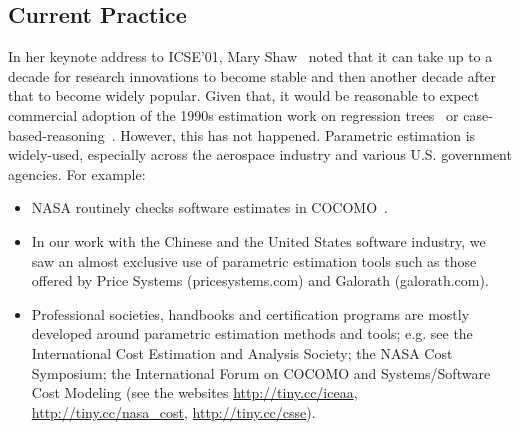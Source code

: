 \documentclass[smallcondesed]{svjour3}
\newcommand{\bi}{\begin{itemize}[leftmargin=0.4cm]}
\newcommand{\ei}{\end{itemize}}
\begin{document}

 
\subsection{Current Practice}
In her keynote address to ICSE'01, Mary Shaw~\cite{shaw01} noted that it can take up to a
decade  for  research innovations
to become stable and then another decade after that to become widely popular. Given that, it would be reasonable
to expect commercial adoption of  the 1990s estimation work
on  regression trees~\cite{shepperd97} or case-based-reasoning~\cite{shepperd97}. However, 
this has not happened.
Parametric estimation is
widely-used, especially across the aerospace
industry and various U.S. government agencies. For example:
\bi
\item
NASA routinely checks  software estimates 
in  COCOMO~\cite{dabney07}.  
\item
In our work with the Chinese and the United States software industry,
we saw an   almost exclusive
use  of parametric estimation tools such as those offered by 
Price Systems (pricesystems.com) and  Galorath (galorath.com).
\item
Professional societies, handbooks and
certification programs are mostly developed around 
parametric estimation methods and tools; e.g. see the 
International Cost Estimation and Analysis Society; the
NASA Cost Symposium;  the
International Forum on COCOMO and Systems/Software
Cost Modeling (see the websites \url{http://tiny.cc/iceaa}, \url{http://tiny.cc/nasa_cost}, \url{http://tiny.cc/csse}).
\ei
\end{document}
